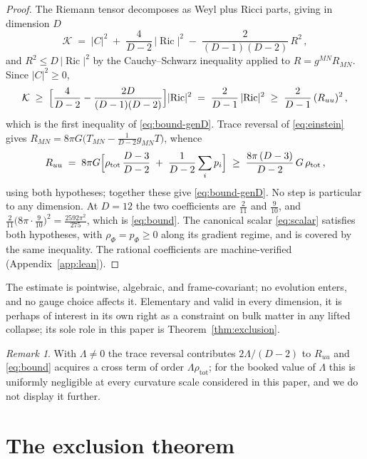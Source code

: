 \documentclass[11pt]{article}
\numberwithin{equation}{section}
\theoremstyle{plain}
\theoremstyle{definition}
\theoremstyle{remark}
\newtheorem{remark}[theorem]{Remark}
\newcommand{\Kr}{\mathcal{K}}
\newcommand{\Ric}{\operatorname{Ric}}
\newcommand{\Geff}{G}
\begin{document}
\begin{proof}
The Riemann tensor decomposes as Weyl plus Ricci parts, giving in
dimension $D$
\[
\Kr \;=\; \lvert C\rvert^{2} \;+\; \frac{4}{D-2}\,
\lvert\Ric\rvert^{2} \;-\; \frac{2}{(D-1)(D-2)}\,R^{2}\,,
\]
and $R^{2} \leq D\,\lvert\Ric\rvert^{2}$ by the Cauchy--Schwarz
inequality applied to $R = g^{MN}R_{MN}$. Since
$\lvert C\rvert^{2} \geq 0$,
\[
\Kr \;\geq\; \Bigl[\frac{4}{D-2} - \frac{2D}{(D-1)(D-2)}\Bigr]
\lvert\Ric\rvert^{2} \;=\; \frac{2}{D-1}\,\lvert\Ric\rvert^{2}
\;\geq\; \frac{2}{D-1}\,(R_{uu})^{2}\,,
\]
which is the first inequality of \eqref{eq:bound-genD}. Trace
reversal of \eqref{eq:einstein} gives
$R_{MN} = 8\pi\Geff\bigl(T_{MN} - \tfrac{1}{D-2}g_{MN}T\bigr)$, whence
\[
R_{uu} \;=\; 8\pi\Geff\Bigl[\rho_{\mathrm{tot}}\,\frac{D-3}{D-2}
\;+\; \frac{1}{D-2}\sum_{i}p_{i}\Bigr]
\;\geq\; \frac{8\pi\,(D-3)}{D-2}\,\Geff\,\rho_{\mathrm{tot}}\,,
\]
using both hypotheses; together these give \eqref{eq:bound-genD}. No
step is particular to any dimension. At $D = 12$ the two coefficients
are $\tfrac{2}{11}$ and $\tfrac{9}{10}$, and
$\tfrac{2}{11}\bigl(8\pi\cdot\tfrac{9}{10}\bigr)^{2} =
\tfrac{2592\pi^{2}}{275}$, which is \eqref{eq:bound}. The canonical scalar \eqref{eq:scalar}
satisfies both hypotheses, with $\rho_{\Phi} = p_{\Phi} \geq 0$ along
its gradient regime, and is covered by the same inequality. The
rational coefficients are machine-verified
(Appendix~\ref{app:lean}).
\end{proof}

The estimate is pointwise, algebraic, and frame-covariant; no
evolution enters, and no gauge choice affects it. Elementary and valid
in every dimension, it is perhaps of interest in its own right as a
constraint on bulk matter in any lifted collapse; its sole role in
this paper is Theorem~\ref{thm:exclusion}.

\begin{remark}\label{rem:lambda}
With $\Lambda \neq 0$ the trace reversal contributes
$2\Lambda/(D-2)$ to $R_{uu}$ and \eqref{eq:bound} acquires a cross
term of order $\Lambda\rho_{\mathrm{tot}}$; for the booked value of
$\Lambda$ this is uniformly negligible at every curvature scale
considered in this paper, and we do not display it further.
\end{remark}

\section{The exclusion theorem}\label{sec:exclusion}
\end{document}
